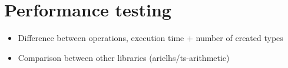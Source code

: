 \section{Performance testing}

\begin{itemize}
  \item Difference between operations, execution time + number of created types 
  \item Comparison between other libraries (arielhs/ts-arithmetic)
\end{itemize}
